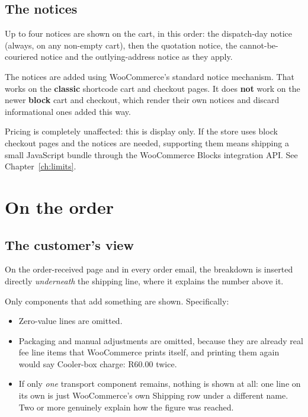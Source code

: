 \documentclass[11pt,a4paper,oneside]{report}
\begin{document}
\subsection{The notices}

Up to four notices are shown on the cart, in this order: the dispatch-day notice
(always, on any non-empty cart), then the quotation notice, the cannot-be-couriered
notice and the outlying-address notice as they apply.

\begin{housewarn}
\label{sec:blocknotice}
The notices are added using WooCommerce's standard notice mechanism. That works on
the \textbf{classic} shortcode cart and checkout pages. It does \textbf{not} work on
the newer \textbf{block} cart and checkout, which render their own notices and
discard informational ones added this way.

Pricing is completely unaffected: this is display only. If the store uses block
checkout pages and the notices are needed, supporting them means shipping a small
JavaScript bundle through the WooCommerce Blocks integration API. See
Chapter~\ref{ch:limits}.
\end{housewarn}

\section{On the order}

\subsection{The customer's view}

On the order-received page and in every order email, the breakdown is inserted
directly \emph{underneath} the shipping line, where it explains the number above it.

Only components that add something are shown. Specifically:

\begin{itemize}
  \item Zero-value lines are omitted.
  \item Packaging and manual adjustments are omitted, because they are already real
        fee line items that WooCommerce prints itself, and printing them again would
        say \textsf{Cooler-box charge: R60.00} twice.
  \item If only \emph{one} transport component remains, nothing is shown at all: one
        line on its own is just WooCommerce's own \textsf{Shipping} row under a
        different name. Two or more genuinely explain how the figure was reached.
\end{itemize}
\end{document}
